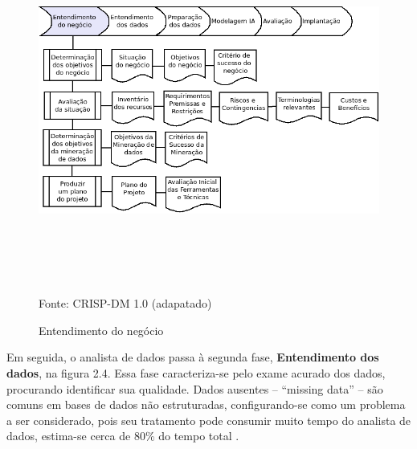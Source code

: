 \begin{figure}[!ht]
\centering
\caption{Entendimento do negócio}
\vspace{1mm}
\includegraphics[width=160mm, height=120mm]{Figuras/Cronograma/Entendimento.png}\\
\tiny Fonte: CRISP-DM 1.0 (adapatado)
\end{figure}

\pagebreak

\vspace{1.5cm}

Em seguida, o analista de dados passa à segunda fase, \textbf{Entendimento dos dados}, na figura 2.4. Essa fase caracteriza-se pelo exame acurado dos dados, procurando identificar sua qualidade. 
Dados ausentes -- ``missing data'' -- são comuns em bases de dados não estruturadas, configurando-se como
um problema a ser considerado, pois seu tratamento pode consumir muito tempo do analista de dados, estima-se cerca de 80\% do tempo total \cite{DataMining}. 

\vspace{0.5cm}

